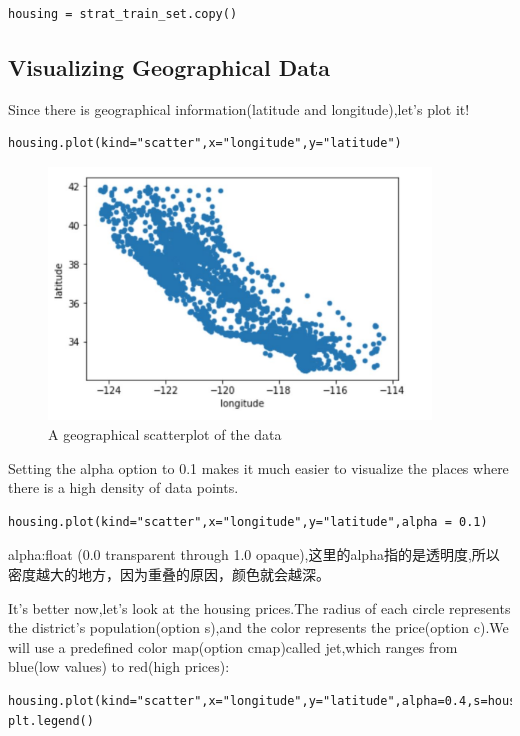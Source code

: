 \documentclass[UTF8]{ctexart}
\begin{document}
\begin{lstlisting}
housing = strat_train_set.copy()
\end{lstlisting}

\subsection{Visualizing Geographical Data}

Since there is geographical information(latitude and longitude),let's plot it!

\begin{lstlisting}
housing.plot(kind="scatter",x="longitude",y="latitude")
\end{lstlisting}

\begin{figure}[H]
\centering
\includegraphics[width = 4in]{longi_and_lati.JPG}
\caption{A geographical scatterplot of the data}
\end{figure}

Setting the alpha option to 0.1 makes it much easier to visualize the places where there is a high density of data points.

\begin{lstlisting}
housing.plot(kind="scatter",x="longitude",y="latitude",alpha = 0.1)
\end{lstlisting}

alpha:float (0.0 transparent through 1.0 opaque),这里的alpha指的是透明度,所以密度越大的地方，因为重叠的原因，颜色就会越深。

It's better now,let's look at the housing prices.The radius of each circle represents the district's population(option s),and the color represents the price(option c).We will use a predefined color map(option cmap)called jet,which ranges from blue(low values) to red(high prices):

\begin{lstlisting}
housing.plot(kind="scatter",x="longitude",y="latitude",alpha=0.4,s=housing["population"]/100,label="population",c="median_house_value",cmap=plt.get_cmap("jet"),colorbar=True)
plt.legend()
\end{lstlisting}
\end{document}
